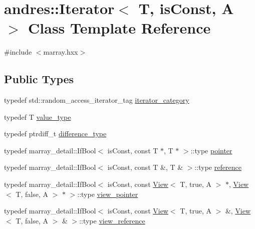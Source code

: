 \hypertarget{classandres_1_1Iterator}{}\section{andres\+:\+:Iterator$<$ T, is\+Const, A $>$ Class Template Reference}
\label{classandres_1_1Iterator}


{\ttfamily \#include $<$marray.\+hxx$>$}

\subsection*{Public Types}
\begin{DoxyCompactItemize}
\item 
typedef std\+::random\+\_\+access\+\_\+iterator\+\_\+tag \hyperlink{classandres_1_1Iterator_a36e37107724fb0c9265f8d3f41f93309}{iterator\+\_\+category}
\item 
typedef T \hyperlink{classandres_1_1Iterator_a3fd8a072268f4ad5c55963a6ea6d7a65}{value\+\_\+type}
\item 
typedef ptrdiff\+\_\+t \hyperlink{classandres_1_1Iterator_a10f8053d87b6b597d9fe011f66a240ca}{difference\+\_\+type}
\item 
typedef marray\+\_\+detail\+::\+If\+Bool$<$ is\+Const, const T $\ast$, T $\ast$ $>$\+::type \hyperlink{classandres_1_1Iterator_adf2ba3f1a3cc9c98bff9c544afdb22f9}{pointer}
\item 
typedef marray\+\_\+detail\+::\+If\+Bool$<$ is\+Const, const T \&, T \& $>$\+::type \hyperlink{classandres_1_1Iterator_a9805f26813688f04c33e798f7999e5f7}{reference}
\item 
typedef marray\+\_\+detail\+::\+If\+Bool$<$ is\+Const, const \hyperlink{classandres_1_1View}{View}$<$ T, true, A $>$ $\ast$, \hyperlink{classandres_1_1View}{View}$<$ T, false, A $>$ $\ast$ $>$\+::type \hyperlink{classandres_1_1Iterator_a937adfd36b5e7b01be53d16bd823af12}{view\+\_\+pointer}
\item 
typedef marray\+\_\+detail\+::\+If\+Bool$<$ is\+Const, const \hyperlink{classandres_1_1View}{View}$<$ T, true, A $>$ \&, \hyperlink{classandres_1_1View}{View}$<$ T, false, A $>$ \& $>$\+::type \hyperlink{classandres_1_1Iterator_aba3b6dd25a055f0aaa7a931657f86a89}{view\+\_\+reference}
\end{DoxyCompactItemize}
